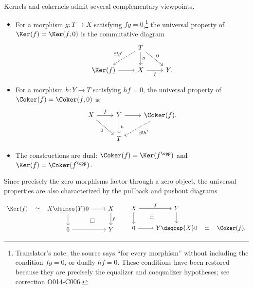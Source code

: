 Kernels and cokernels admit several complementary viewpoints.
\begin{itemize}
	\item For a morphism $g:T\to X$ satisfying $fg=0$,\footnote{Translator's note: the source says ``for every morphism'' without including the condition $fg=0$, or dually $hf=0$. These conditions have been restored because they are precisely the equalizer and coequalizer hypotheses; see correction O014-C006.} the universal property of $\Ker(f)=\Ker(f,0)$ is the commutative diagram
	\[\begin{tikzcd}
		& T \arrow[dashrightarrow, ld, "{\exists! g'}"'] \arrow[d, "g"] \arrow[rd, "0"] & \\
		\Ker(f) \arrow[r] & X \arrow[r, "f"'] & Y .
	\end{tikzcd}\]
	\item For a morphism $h:Y\to T$ satisfying $hf=0$, the universal property of $\Coker(f)=\Coker(f,0)$ is
	\[\begin{tikzcd}
		X \arrow[r, "f"] \arrow[rd, "0"'] & Y \arrow[r] \arrow[d, "h"] & \Coker(f) \arrow[dashrightarrow, ld, "{\exists! h'}"] . \\
		& T &
	\end{tikzcd}\]
	\item The constructions are dual: $\Coker(f)=\Ker(f^{\opp})$ and $\Ker(f)=\Coker(f^{\opp})$.
\end{itemize}

Since precisely the zero morphisms factor through a zero object, the universal properties are also characterized by the pullback and pushout diagrams

\begin{equation}\label{eqn:Ker-Coker-triangles}
	\begin{tikzcd}
		\Ker(f) \arrow[phantom, r, "\simeq" description] & X \dtimes{Y} 0 \arrow[r] \arrow[d] \arrow[phantom, rd, "\Box" description] & X \arrow[d, "f"] \\
		& 0 \arrow[r] & Y
	\end{tikzcd} \qquad \begin{tikzcd}
		X \arrow[r, "f"] \arrow[d] & Y \arrow[d] & \\
		0 \arrow[r] & Y \dsqcup{X} 0 \arrow[phantom, lu, "\boxplus" description] & \Coker(f) \arrow[phantom, l, "\simeq" description] .
\end{tikzcd}\end{equation}

